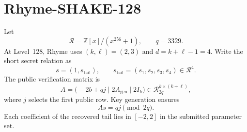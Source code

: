 \documentclass[11pt,a4paper]{article}
\newcommand{\R}{\mathcal{R}}
\newcommand{\Z}{\mathbb{Z}}
\begin{document}
\section{Rhyme-SHAKE-128}
\label{sec:scheme}

Let
\[
  \R=\Z[x]/(x^{256}+1),\qquad q=3329.
\]
At Level~128, Rhyme uses $(k,\ell)=(2,3)$ and
$d=k+\ell-1=4$.  Write the short secret relation as
\[
                  s=(1,s_{\mathrm{tail}}),
       \qquad s_{\mathrm{tail}}=(s_1,s_2,s_3,s_4)\in\R^4.
\]
The public verification matrix is
\begin{equation}
 A=\bigl(-2b+qj\mid 2A_{\mathrm{gen}}\mid 2I_k\bigr)
       \in \R_{2q}^{k\times(k+\ell)},                 \label{eq:A}
\end{equation}
where $j$ selects the first public row.  Key generation ensures
\begin{equation}
                         As=qj\pmod {2q}.              \label{eq:keyrel}
\end{equation}
Each coefficient of the recovered tail lies in $[-2,2]$ in the submitted
parameter set.
\end{document}
